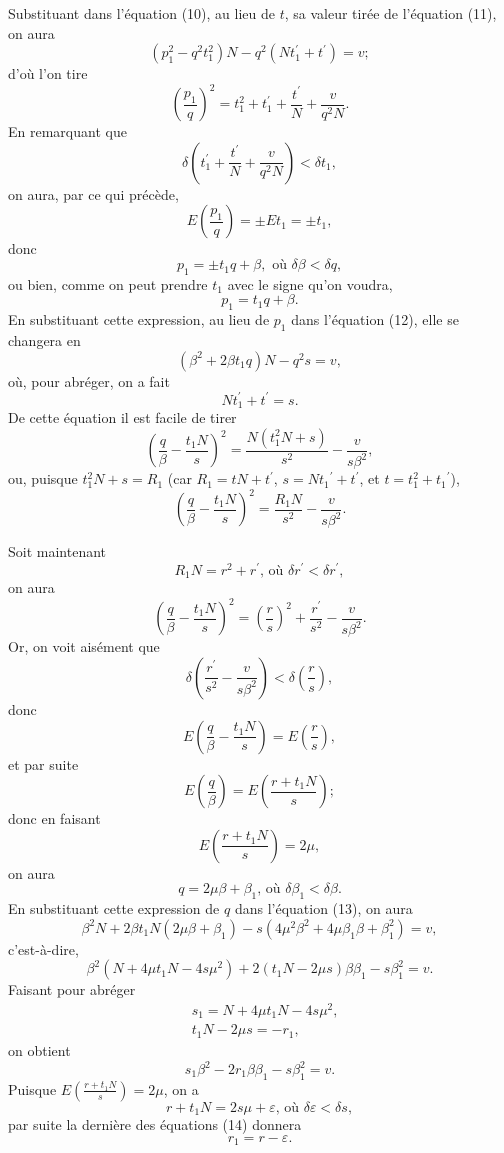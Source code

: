 \documentclass[oneside, 12 pt, leqno]{memoir}
\begin{document}
Substituant dans l'équation (10), au lieu de \(t\), sa valeur tirée de l'équation (11), on aura
\[\tag{12}\left(p_1^2-q^2 t_1^2\right) N-q^2\left(N t_1^{\prime}+t^{\prime}\right)=v;\]
d'où l'on tire
\[\left(\frac{p_1}{q}\right)^2=t_1^2+t_1^{\prime}+\frac{t^{\prime}}{N}+\frac{v}{q^2 N}.\]
En remarquant que
\[\delta\left(t_1^{\prime}+\frac{t^{\prime}}{N}+\frac{v}{q^2 N}\right)<\delta t_1,\]
on aura, par ce qui précède,
\[E\left(\frac{p_1}{q}\right)= \pm E t_1= \pm t_1,\]
donc
\[p_1= \pm t_1 q+\beta, \text { où } \delta \beta<\delta q,\]
ou bien, comme on peut prendre \(t_1\) avec le signe qu'on voudra,
\[p_1=t_1 q+\beta.\]
En substituant cette expression, au lieu de \(p_1\) dans l'équation (12), elle se changera en
\[\tag{13}\left(\beta^2+2 \beta t_1 q\right) N-q^2 s=v,\]
où, pour abréger, on a fait
\[N t_1^{\prime}+t^{\prime}=s.\]
De cette équation il est facile de tirer
\[\left(\frac{q}{\beta}-\frac{t_1 N}{s}\right)^2=\frac{N\left(t_1^2 N+s\right)}{s^2}-\frac{v}{s \beta^2},\]
ou, puisque \(t_1^2 N+s=R_1\) (car \(R_1=t N+t^{\prime}\), \(s=N {t_1}^{\prime}+t^{\prime}\), et \(t=t_1^2+{t_1}^{\prime}\)),
\[\left(\frac{q}{\beta}-\frac{t_1 N}{s}\right)^2=\frac{R_1 N}{s^2}-\frac{v}{s \beta^2}.\]

Soit maintenant
\[R_1 N=r^2+r^{\prime} \text {, où } \delta r^{\prime}<\delta r^{\prime},\]
on aura
\[\left(\frac{q}{\beta}-\frac{t_1 N}{s}\right)^2=\left(\frac{r}{s}\right)^2+\frac{r^{\prime}}{s^2}-\frac{v}{s \beta^2}.\]
Or, on voit aisément que
\[\delta\left(\frac{r^{\prime}}{s^2}-\frac{v}{s \beta^2}\right)<\delta\left(\frac{r}{s}\right),\]
donc
\[E\left(\frac{q}{\beta}-\frac{t_1 N}{s}\right)=E\left(\frac{r}{s}\right),\]
et par suite
\[E\left(\frac{q}{\beta}\right)=E\left(\frac{r+t_1 N}{s}\right);\]
donc en faisant
\[E\left(\frac{r+t_1 N}{s}\right)=2 \mu,\]
on aura
\[q=2 \mu \beta+\beta_1 \text {, où } \delta \beta_1<\delta \beta .\]
En substituant cette expression de \(q\) dans l'équation (13), on aura
\[\beta^2 N+2 \beta t_1 N\left(2 \mu \beta+\beta_1\right)-s\left(4 \mu^2 \beta^2+4 \mu \beta_1 \beta+\beta_1^2\right)=v,\]
c'est-à-dire,
\[\beta^2\left(N+4 \mu t_1 N-4 s \mu^2\right)+2\left(t_1 N-2 \mu s\right) \beta \beta_1-s \beta_1^2=v.\]
Faisant pour abréger
\[\tag{14}\begin{aligned}
& s_1=N+4 \mu t_1 N-4 s \mu^2, \\
& t_1 N-2 \mu s=-r_1,
\end{aligned}\]
on obtient
\[\tag{15}s_1 \beta^2-2 r_1 \beta \beta_1-s \beta_1^2=v.\]
Puisque \(E\left(\frac{r+t_1 N}{s}\right)=2 \mu\), on a
\[r+t_1 N=2 s \mu+\varepsilon \text {, où } \delta \varepsilon<\delta s,\]
par suite la dernière des équations (14) donnera
\[r_1=r-\varepsilon.\]
\end{document}
